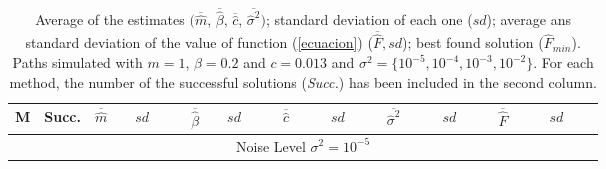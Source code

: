 \documentclass{sig-alternate}
\begin{document}
{\scriptsize
\begin{table}
\caption{\footnotesize{Average of the estimates $(\overline{\hat{m}}$, $\overline{\hat{\beta}}$, $\overline{\hat{c}}$, $\overline{\hat{\sigma}^{2}})$; standard deviation of each one ($sd$); average ans standard deviation of the value of function (\ref{ecuacion}) ($\overline{\hat{F}},sd$); best found solution (${\hat{F}}_{min}$). Paths simulated with $m=1$, $\beta=0.2$ and $c=0.013$ and $\sigma^2=\{10^{-5},10^{-4},10^{-3},10^{-2}\}$. For each method, the number of the successful solutions (\emph{Succ.}) has been included in the second column.}}
\begin{center}
{\scriptsize
\begin{tabular}{lc|rrrrrrrrrr}
   M & Succ.  & $\overline{\hat{m}}\quad$&$sd\qquad$ &  $\overline{\hat{\beta}}\quad$ &$sd\qquad$ &  $\overline{\hat{c}}\qquad$ &$sd\qquad$ &  $\overline{\hat{\sigma}^{2}}\quad\quad$ &$sd\qquad$& $\overline{\hat{F}}\qquad$  &$sd\qquad$ \\
\hline
\multicolumn{12}{c}{Noise Level $\sigma^2=10^{-5}$} \\


\end{tabular}}
\end{center}
\end{table}}
\end{document}
